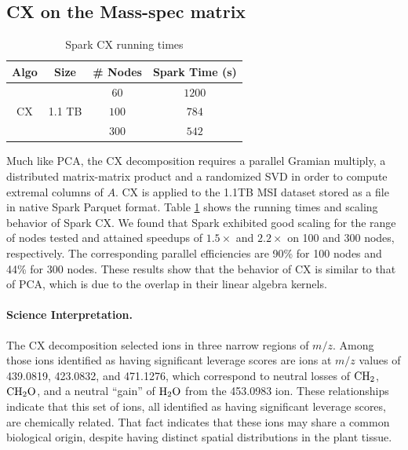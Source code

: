 \subsection{CX on the Mass-spec matrix}
\begin{table}[t]
\centering
\begin{tabular}{|c|c|c|c|} \hline
Algo & Size & \# Nodes & Spark Time (s)\\ \hline
\multirow{3}{*}{CX} & \multirow{3}{*}{1.1 TB} & $60$ & $1200$\\
{} & {} & $100$  & $784$\\
{} & {} & $300$ & $542$\\ \hline
\end{tabular}
\caption{Spark CX running times}
\label{tab:cxscale}
\end{table}
Much like PCA, the CX decomposition requires a parallel Gramian multiply, a distributed matrix-matrix product and a randomized SVD in order to compute extremal columns of $A$. CX is applied to the 1.1TB MSI dataset stored as a file in native Spark Parquet format. Table \ref{tab:cxscale} shows the running times and scaling behavior of Spark CX. We found that Spark exhibited good scaling for the range of nodes tested and attained speedups of $1.5\times$ and $2.2\times$ on 100 and 300 nodes, respectively. The corresponding parallel efficiencies are 90\% for 100 nodes and 44\% for 300 nodes. These results show that the behavior of CX is similar to that of PCA, which is due to the overlap in their linear algebra kernels.

\paragraph{Science Interpretation.}
 The CX decomposition selected ions in three narrow regions of $m/z$. Among those ions identified as having significant leverage scores are ions at $m/z$ values of 439.0819, 423.0832, and 471.1276, which correspond to neutral losses of $\rm{CH_2}$, $\rm{CH_2O}$, and a neutral ``gain'' of $\rm{H_2O}$ from the 453.0983 ion.  These relationships indicate that this set of ions, all identified as having significant leverage scores, are chemically related.  That fact indicates that these ions may share a common biological origin, despite having distinct spatial distributions in the plant tissue.  

